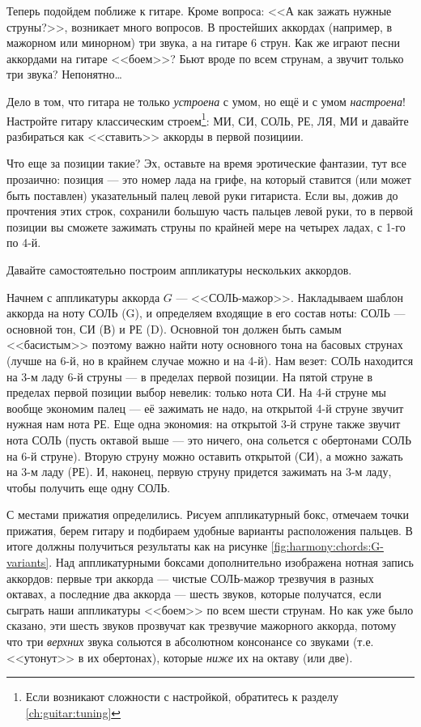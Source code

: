 Теперь подойдем поближе к гитаре. Кроме вопроса: <<А как зажать нужные струны?>>, возникает много вопросов. В простейших аккордах (например, в мажорном или минорном) три звука, а на гитаре 6 струн. Как же играют песни аккордами на гитаре <<боем>>? Бьют вроде по всем струнам, а звучит только три звука? Непонятно\ldots

Дело в том, что гитара не только \emph{устроена} с умом, но ещё и с умом \emph{настроена}! Настройте гитару классическим строем\footnote{Если возникают сложности с настройкой, обратитесь к разделу \ref{ch:guitar:tuning}}: МИ, СИ, СОЛЬ, РЕ, ЛЯ, МИ и давайте разбираться как <<ставить>> аккорды в первой позициии.

Что еще за позиции такие? Эх, оставьте на время эротические фантазии, тут все прозаично: позиция --- это номер лада на грифе, на который ставится (или может быть поставлен) указательный палец левой руки гитариста. Если вы, дожив до прочтения этих строк, сохранили большую часть пальцев левой руки, то в первой позиции вы сможете зажимать струны по крайней мере на четырех ладах, с 1-го по 4-й.

Давайте самостоятельно построим аппликатуры нескольких аккордов. 

Начнем с аппликатуры аккорда $G$ --- <<СОЛЬ-мажор>>. Накладываем шаблон аккорда на ноту СОЛЬ (G), и определяем входящие в его состав ноты: СОЛЬ --- основной тон, СИ (В) и РЕ (D). Основной тон должен быть самым <<басистым>> поэтому важно найти ноту основного тона на басовых струнах (лучше на 6-й, но в крайнем случае можно и на 4-й). Нам везет: СОЛЬ находится на 3-м ладу 6-й струны --- в пределах первой позиции. На пятой струне в пределах первой позиции выбор невелик: только нота СИ. На 4-й струне мы вообще экономим палец --- её зажимать не надо, на открытой 4-й струне звучит нужная нам нота РЕ. Еще одна экономия: на открытой 3-й струне также звучит нота СОЛЬ (пусть октавой выше --- это ничего, она сольется с обертонами СОЛЬ на 6-й струне). Вторую струну можно оставить открытой (СИ), а можно зажать на 3-м ладу (РЕ). И, наконец, первую струну придется зажимать на 3-м ладу, чтобы получить еще одну СОЛЬ.

С местами прижатия определились. Рисуем аппликатурный бокс, отмечаем точки прижатия, берем гитару и подбираем удобные варианты расположения пальцев. В итоге должны получиться результаты как на рисунке \ref{fig:harmony:chords:G-variants}. Над аппликатурными боксами дополнительно изображена нотная запись аккордов: первые три аккорда --- чистые СОЛЬ-мажор трезвучия в разных октавах, а последние два аккорда --- шесть звуков, которые получатся, если сыграть наши аппликатуры <<боем>> по всем шести струнам. Но как уже было сказано, эти шесть звуков прозвучат как трезвучие мажорного аккорда, потому что три \emph{верхних} звука сольются в абсолютном консонансе со звуками (т.е. <<утонут>> в их обертонах), которые \emph{ниже} их на октаву (или две).

